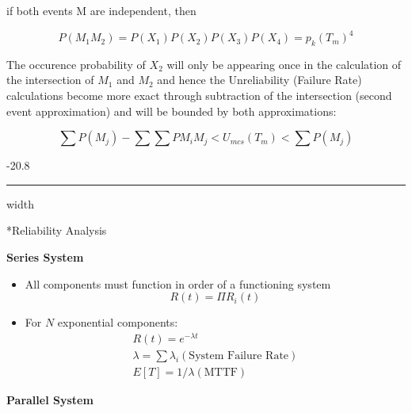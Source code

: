 \documentclass[8pt, landscape, fleqn]{scrartcl}
\makeatletter
\renewcommand{\subsubsection}{\@startsection{subsubsection}{1}{0mm}%
{-2\baselineskip}{0.8\baselineskip}%
{\hrule depth 0.2pt width\columnwidth\vspace*{1.2em}\normalsize\bfseries\rmfamily}}
\makeatother
\begin{document}
\begin{multicols*}{3}
if both events M are independent, then

\begin{equation}
    P(M_1 M_2) = P(X_1)P(X_2)P(X_3)P(X_4) = p_k(T_m)^4
\end{equation}

The occurence probability of $X_2$ will only be appearing once in the calculation of the intersection of $M_1$ and $M_2$ and hence the Unreliability (Failure Rate) calculations become more exact through subtraction of the intersection (second event approximation) and will be bounded by both approximations:

\begin{equation}
    \sum P(M_j) - \sum \sum P{M_i M_j} < U_{mcs}(T_m) < \sum P(M_j)
\end{equation}

\subsubsection*{Reliability Analysis}

\textbf{Series System} 

\begin{itemize}
    \item All components must function in order of a functioning system 
    \begin{equation}
        R(t) = \Pi R_i(t) \end{equation}
    \item For $N$ exponential components:
    \begin{align}
        R(t) = e^{-\lambda t} \\
        \lambda = \sum \lambda_i (\text{System Failure Rate})\\
        E[T] = 1 / \lambda (\text{MTTF})
    \end{align}

\end{itemize}

\textbf{Parallel System}


\end{multicols*}
\end{document}
